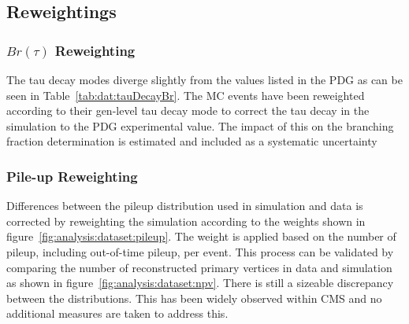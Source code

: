 




\subsection{Reweightings}

\subsubsection{$Br(\tau)$ Reweighting}

The tau decay modes diverge slightly from the values listed in the PDG as can be seen in Table~\ref{tab:dat:tauDecayBr}. The MC events have been reweighted according to their gen-level tau decay mode to correct the tau decay in the simulation to the PDG experimental value. The impact of this on the branching fraction determination is estimated and included as a systematic uncertainty




\subsubsection{Pile-up Reweighting}
Differences between the pileup distribution used in simulation and data is corrected by reweighting the simulation according to the weights shown in figure~\ref{fig:analysis:dataset:pileup}. The weight is applied based on the number of pileup, including out-of-time pileup, per event.  This process can be validated by comparing the number of reconstructed primary vertices in data and simulation as shown in figure~\ref{fig:analysis:dataset:npv}. There is still a sizeable discrepancy between the distributions. This has been widely observed within CMS and no additional measures are taken to address this.


